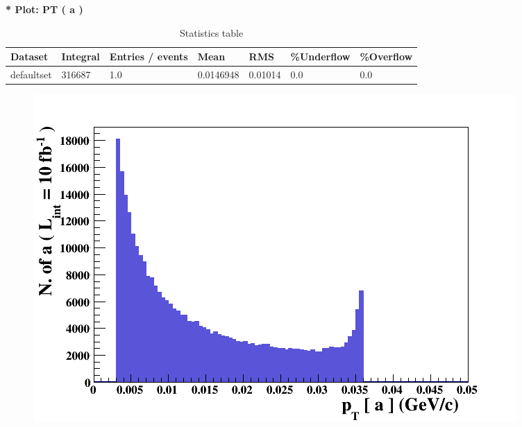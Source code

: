 \documentclass[a4paper, 11pt]{article}
\begin{document}
   \textbf{   * Plot: PT ( a ) }
\textbf{ }\begin{table}[!h]
  \begin{center}
    \caption{ Statistics table}
    \begin{tabular}{|m{17.0mm}|m{27.0mm}|m{23.0mm}|m{18.0mm}|m{18.0mm}|m{14.0mm}|m{14.0mm}|}
      \hline
      \cellcolor{yellow}         Dataset& \cellcolor{yellow}         Integral& \cellcolor{yellow}         Entries /\- events& \cellcolor{yellow}         Mean& \cellcolor{yellow}         RMS& \cellcolor{yellow}         \%Underflow& \cellcolor{yellow}         \%Overflow\\
      \hline
      \cellcolor{white}         defaultset& \cellcolor{white}         316687& \cellcolor{white}         1.0& \cellcolor{white}         0.0146948& \cellcolor{white}         0.01014& \cellcolor{green}         0.0& \cellcolor{green}         0.0\\
\hline
    \end{tabular}
  \end{center}
\end{table}

\begin{figure}[!h]
  \begin{center}
    \includegraphics[scale=0.6]{selection_1.png}\\
\caption{}
  \end{center}
\end{figure}
\newpage
   
\end{document}
